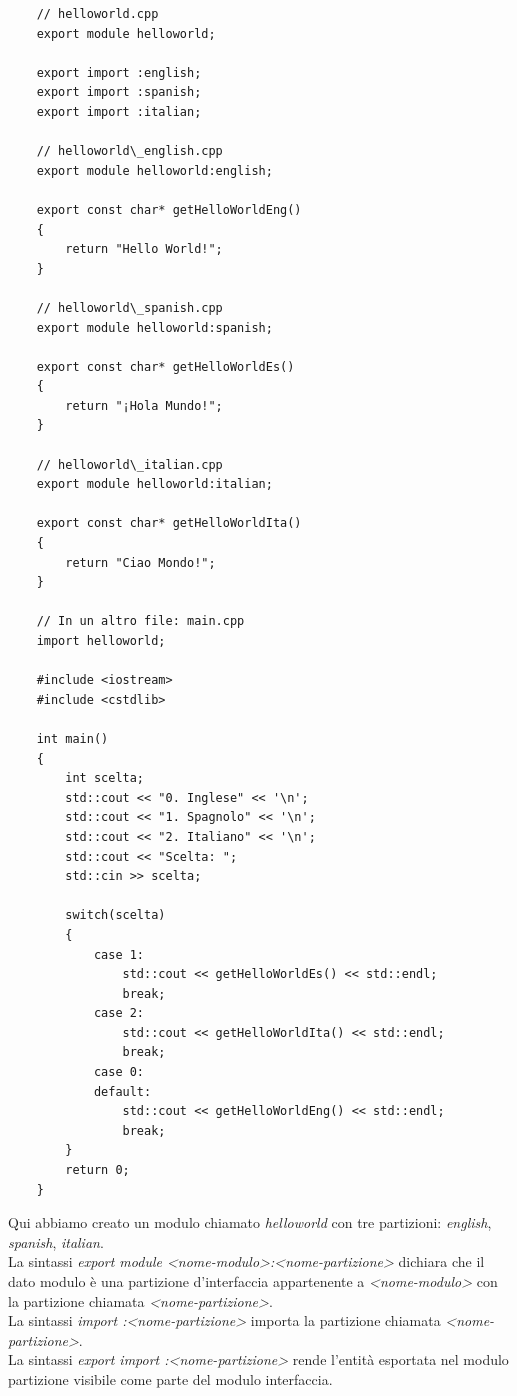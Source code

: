 \begin{lstlisting}
	// helloworld.cpp
	export module helloworld;
	
	export import :english;
	export import :spanish;
	export import :italian;
	
	// helloworld\_english.cpp
	export module helloworld:english;
	
	export const char* getHelloWorldEng()
	{
		return "Hello World!";
	}

	// helloworld\_spanish.cpp
	export module helloworld:spanish;
	
	export const char* getHelloWorldEs()
	{
		return "¡Hola Mundo!";
	}

	// helloworld\_italian.cpp
	export module helloworld:italian;

	export const char* getHelloWorldIta()
	{
		return "Ciao Mondo!";
	}

	// In un altro file: main.cpp
	import helloworld;
	
	#include <iostream>
	#include <cstdlib>
	
	int main()
	{
		int scelta;
		std::cout << "0. Inglese" << '\n';
		std::cout << "1. Spagnolo" << '\n';
		std::cout << "2. Italiano" << '\n';
		std::cout << "Scelta: ";
		std::cin >> scelta;
		
		switch(scelta)
		{
			case 1:
				std::cout << getHelloWorldEs() << std::endl;
				break;
			case 2:
				std::cout << getHelloWorldIta() << std::endl;
				break;
			case 0:
			default:
				std::cout << getHelloWorldEng() << std::endl;
				break;
		}
		return 0;
	}
\end{lstlisting}

\textsf{\small Qui abbiamo creato un modulo chiamato \emph{helloworld} con tre partizioni: \emph{english}, \emph{spanish}, \emph{italian}. } \\ 

\textsf{\small La sintassi \emph{export module <nome-modulo>:<nome-partizione>} dichiara che il dato modulo è una partizione d'interfaccia appartenente a \emph{<nome-modulo>} con la partizione chiamata \emph{<nome-partizione>}.} \\

\textsf{\small La sintassi \emph{import :<nome-partizione>} importa la partizione chiamata \emph{<nome-partizione>}.} \\

\textsf{\small La sintassi \emph{export import :<nome-partizione>} rende l'entità esportata nel modulo partizione visibile come parte del modulo interfaccia.} \\

